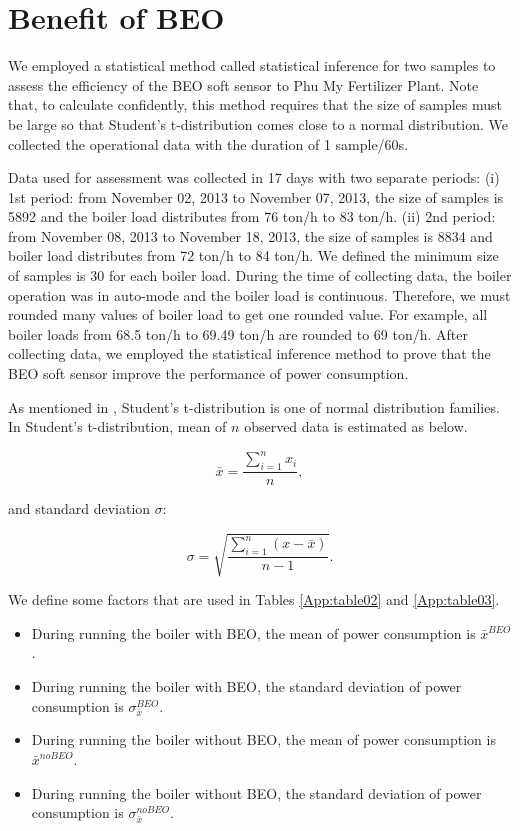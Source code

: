 \section{Benefit of BEO}

We employed a statistical method called statistical inference for two samples \cite{boi:ref_14} to assess the efficiency of the BEO soft sensor to Phu My Fertilizer Plant. Note that, to calculate confidently, this method requires that the size of samples must be large so that Student's t-distribution comes close to a normal distribution. We collected the operational data with the duration of 1 sample/60s. 

Data used for assessment was collected in 17 days with two separate periods: (i) 1st period: from November 02, 2013 to November 07, 2013, the size of samples is 5892 and the boiler load distributes from 76 ton/h to 83 ton/h. (ii) 2nd period: from November 08, 2013 to November 18, 2013, the size of samples is 8834 and boiler load distributes from 72 ton/h to 84 ton/h. We defined the minimum size of samples is 30 for each boiler load. During the time of collecting data, the boiler operation was in auto-mode and the boiler load is continuous. Therefore, we must rounded many values of boiler load to get one rounded value. For example, all boiler loads from 68.5 ton/h to 69.49 ton/h are rounded to 69 ton/h. After collecting data, we employed the statistical inference method to prove that the BEO soft sensor improve the performance of power consumption. 

As mentioned in \cite{boi:ref_14}, Student's t-distribution is one of normal distribution families. In Student's t-distribution, mean of $n$ observed data is estimated as below.

\begin{equation}
\bar{x} = \frac{\sum_{i=1}^nx_i}{n},
\end{equation}

and standard deviation $\sigma$:

\begin{equation}
\sigma = \sqrt{\frac{\sum_{i=1}^n(x - \bar{x})}{n-1}}.
\end{equation}

We define some factors that are used in Tables \ref{App:table02} and \ref{App:table03}.

\begin{itemize}
\item During running the boiler with BEO, the mean of power consumption is $\bar{x}^{BEO}$.
\item During running the boiler with BEO, the standard deviation of power consumption is $\sigma_{\bar{x}}^{BEO}$.
\item During running the boiler without BEO, the mean of power consumption is $\bar{x}^{noBEO}$.
\item During running the boiler without BEO, the standard deviation of power consumption is $\sigma_{\bar{x}}^{noBEO}$.
\end{itemize}

